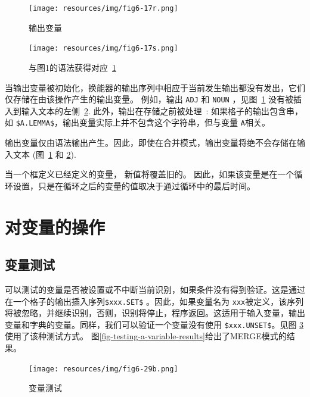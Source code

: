 \begin{figure}[!ht]
\begin{center}
\texttt{[image: resources/img/fig6-17r.png]}
\caption{输出变量\label{fig-output-variables}}
\end{center}
\end{figure}

\begin{figure}[!ht]
\begin{center}
\texttt{[image: resources/img/fig6-17s.png]}
\caption{与图1的语法获得对应~\ref{fig-output-variables}\label{fig-output-variables-concord}}
\end{center}
\end{figure}

\bigskip
\noindent 当输出变量被初始化，换能器的输出序列中相应于当前发生输出都没有发出，它们仅存储在由该操作产生的输出变量。
例如，输出 \verb+ADJ+ 和 \verb+NOUN+ ，见图~\ref{fig-output-variables}
没有被插入到输入文本的左侧~\ref{fig-output-variables-concord}.
此外，输出在存储之前被处理~: 如果格子的输出包含串，如
\verb+$A.LEMMA$+，输出变量实际上并不包含这个字符串，但与变量 \verb+A+相关。

\bigskip
\noindent 输出变量仅由语法输出产生。因此，即使在合并模式，输出变量将绝不会存储在输入文本
(图~\ref{fig-output-variables} 和 \ref{fig-output-variables-concord}).

\bigskip
\noindent 当一个框定义已经定义的变量，
 新值将覆盖旧的。
因此，如果该变量是在一个循环设置，只是在循环之后的变量的值取决于通过循环中的最后时间。


\section{对变量的操作}
\label{section-ops-on-variables}
\subsection{变量测试}

\noindent 可以测试的变量是否被设置或不中断当前识别，如果条件没有得到验证。这是通过在一个格子的输出插入序列\verb+$xxx.SET$+ 。因此，如果变量名为 \verb+xxx+被定义，该序列将被忽略，并继续识别，否则，识别将停止，程序返回。这适用于输入变量，输出变量和字典的变量。同样，我们可以验证一个变量没有使用 \verb+$xxx.UNSET$+。见图 \ref{fig-testing-a-variable}使用了该种测试方式。 图\ref{fig-testing-a-variable-results}给出了MERGE模式的结果。

\begin{figure}[!ht]
\begin{center}
\texttt{[image: resources/img/fig6-29b.png]}
\caption{变量测试\label{fig-testing-a-variable}}
\end{center}
\end{figure}

